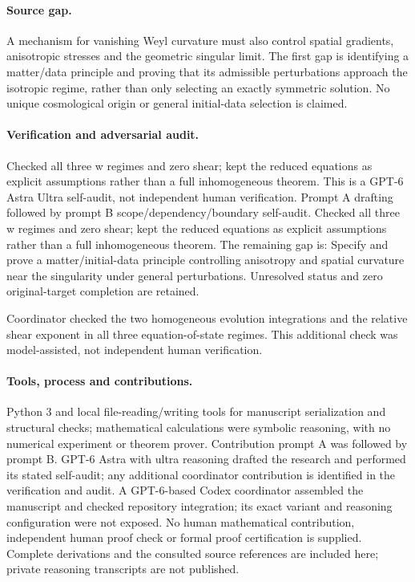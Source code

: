 \documentclass[11pt]{article}
\begin{document}
\paragraph{Source gap.} A mechanism for vanishing Weyl curvature must also control spatial gradients, anisotropic stresses and the geometric singular limit. The first gap is identifying a matter/data principle and proving that its admissible perturbations approach the isotropic regime, rather than only selecting an exactly symmetric solution. No unique cosmological origin or general initial-data selection is claimed.

\paragraph{Verification and adversarial audit.}
Checked all three w regimes and zero shear; kept the reduced equations as explicit assumptions rather than a full inhomogeneous theorem. This is a GPT-6 Astra Ultra self-audit, not independent human verification. Prompt A drafting followed by prompt B scope/dependency/boundary self-audit. Checked all three w regimes and zero shear; kept the reduced equations as explicit assumptions rather than a full inhomogeneous theorem. The remaining gap is: Specify and prove a matter/initial-data principle controlling anisotropy and spatial curvature near the singularity under general perturbations. Unresolved status and zero original-target completion are retained.

Coordinator checked the two homogeneous evolution integrations and the relative shear exponent in all three equation-of-state regimes. This additional check was model-assisted, not independent human verification.

\paragraph{Tools, process and contributions.}
Python 3 and local file-reading/writing tools for manuscript serialization and structural checks; mathematical calculations were symbolic reasoning, with no numerical experiment or theorem prover. Contribution prompt A was followed by prompt B. GPT-6 Astra with ultra reasoning drafted the research and performed its stated self-audit; any additional coordinator contribution is identified in the verification and audit. A GPT-6-based Codex coordinator assembled the manuscript and checked repository integration; its exact variant and reasoning configuration were not exposed. No human mathematical contribution, independent human proof check or formal proof certification is supplied. Complete derivations and the consulted source references are included here; private reasoning transcripts are not published.
\end{document}
